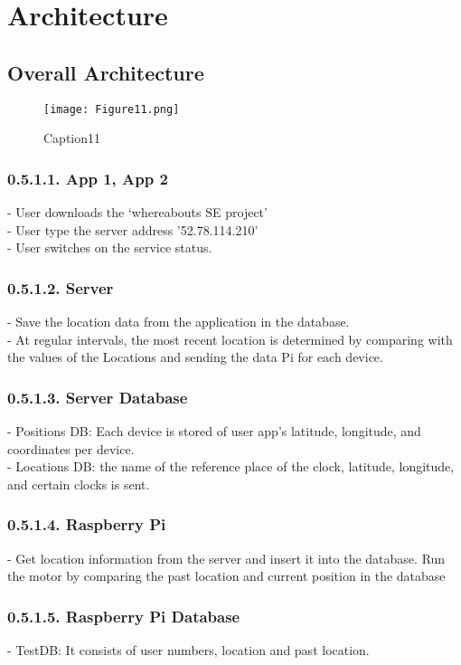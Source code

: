 \documentclass[10pt,a4paper,twocolumn]{report}
\begin{document}
\section{Architecture}
	\subsection{Overall Architecture}
		\begin{figure}[h]
				\texttt{[image: Figure11.png]}
				\caption{Caption11}
				\label{fig11}
		\end{figure} 
	
		\subsubsection{0.5.1.1. App 1, App 2}
		- User downloads the ‘whereabouts SE project’ \\
		- User type the server address ’52.78.114.210’ \\
		- User switches on the service status. \\
		
		\subsubsection{0.5.1.2. Server}
		- Save the location data from the application in the database.\\
- At regular intervals, the most recent location is determined by comparing with the values of the Locations and sending the data Pi for each device.\\
		\subsubsection{0.5.1.3. Server Database}
		- Positions DB: Each device is stored of user app’s latitude, longitude, and coordinates per device.\\
- Locations DB: the name of the reference place of the clock, latitude, longitude, and certain clocks is sent.\\
		\subsubsection{0.5.1.4. Raspberry Pi}
		-  Get location information from the server and insert it into the database. Run the motor by comparing the past location and current position in the database \\
		\subsubsection{0.5.1.5. Raspberry Pi Database}
		- TestDB: It consists of user numbers, location and past location.\\
\end{document}
